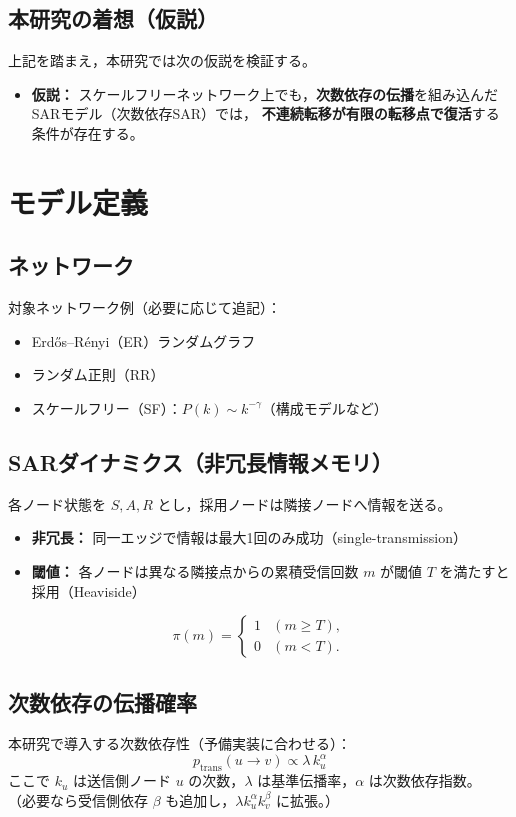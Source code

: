 \documentclass[uplatex,dvipdfmx,11pt]{bxjsarticle}
\newcommand{\SF}{\textsf{SF}}
\newcommand{\ER}{\textsf{ER}}
\newcommand{\RR}{\textsf{RR}}
\begin{document}
\subsection{本研究の着想（仮説）}
上記を踏まえ，本研究では次の仮説を検証する。

\begin{itemize}[leftmargin=2em]
  \item \textbf{仮説：} スケールフリーネットワーク上でも，\textbf{次数依存の伝播}を組み込んだSARモデル（次数依存SAR）では，
  \textbf{不連続転移が有限の転移点で復活}する条件が存在する。
\end{itemize}

\section{モデル定義}
\subsection{ネットワーク}
対象ネットワーク例（必要に応じて追記）：
\begin{itemize}[leftmargin=2em]
  \item Erd\H{o}s--R\'enyi（\ER）ランダムグラフ
  \item ランダム正則（\RR）
  \item スケールフリー（\SF）：$P(k)\sim k^{-\gamma}$（構成モデルなど）
\end{itemize}

\subsection{SARダイナミクス（非冗長情報メモリ）}
各ノード状態を $S,A,R$ とし，採用ノードは隣接ノードへ情報を送る。
\begin{itemize}[leftmargin=2em]
  \item \textbf{非冗長：} 同一エッジで情報は最大1回のみ成功（single-transmission）
  \item \textbf{閾値：} 各ノードは異なる隣接点からの累積受信回数 $m$ が閾値 $T$ を満たすと採用（Heaviside）
\end{itemize}
\begin{equation}
\pi(m)=
\begin{cases}
1 & (m\ge T),\\
0 & (m<T).
\end{cases}
\end{equation}

\subsection{次数依存の伝播確率}
本研究で導入する次数依存性（予備実装に合わせる）：
\begin{equation}
p_{\text{trans}}(u\to v) \propto \lambda \, k_u^{\alpha}
\label{eq:lambda_k_alpha}
\end{equation}
ここで $k_u$ は送信側ノード $u$ の次数，$\lambda$ は基準伝播率，$\alpha$ は次数依存指数。
（必要なら受信側依存 $\beta$ も追加し，$\lambda k_u^\alpha k_v^\beta$ に拡張。）
\end{document}
